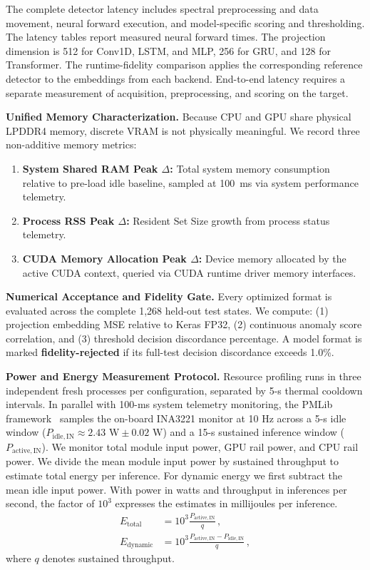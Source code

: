 \documentclass[11pt,a4paper]{article}
\begin{document}
The complete detector latency includes spectral preprocessing and data movement, neural forward execution, and model-specific scoring and thresholding. The latency tables report measured neural forward times. The projection dimension is 512 for Conv1D, LSTM, and MLP, 256 for GRU, and 128 for Transformer. The runtime-fidelity comparison applies the corresponding reference detector to the embeddings from each backend. End-to-end latency requires a separate measurement of acquisition, preprocessing, and scoring on the target.

\textbf{Unified Memory Characterization.} Because CPU and GPU share physical LPDDR4 memory, discrete VRAM is not physically meaningful. We record three non-additive memory metrics:
\begin{enumerate}
    \item \textbf{System Shared RAM Peak $\Delta$:} Total system memory consumption relative to pre-load idle baseline, sampled at 100~ms via system performance telemetry.
    \item \textbf{Process RSS Peak $\Delta$:} Resident Set Size growth from process status telemetry.
    \item \textbf{CUDA Memory Allocation Peak $\Delta$:} Device memory allocated by the active CUDA context, queried via CUDA runtime driver memory interfaces.
\end{enumerate}

\textbf{Numerical Acceptance and Fidelity Gate.} Every optimized format is evaluated across the complete 1,268 held-out test states. We compute: (1) projection embedding MSE relative to Keras FP32, (2) continuous anomaly score correlation, and (3) threshold decision discordance percentage. A model format is marked \textbf{fidelity-rejected} if its full-test decision discordance exceeds 1.0\%.

\textbf{Power and Energy Measurement Protocol.} Resource profiling runs in three independent fresh processes per configuration, separated by 5-s thermal cooldown intervals. In parallel with 100-ms system telemetry monitoring, the PMLib framework~\cite{barrachina2013integrated} samples the on-board INA3221 monitor at 10 Hz across a 5-s idle window ($P_{\mathrm{idle,IN}} \approx 2.43\text{ W} \pm 0.02\text{ W}$) and a 15-s sustained inference window ($P_{\mathrm{active,IN}}$). We monitor total module input power, GPU rail power, and CPU rail power. We divide the mean module input power by sustained throughput to estimate total energy per inference. For dynamic energy we first subtract the mean idle input power. With power in watts and throughput in inferences per second, the factor of $10^3$ expresses the estimates in millijoules per inference.
\begin{align}
E_{\mathrm{total}} &= 10^3\frac{P_{\mathrm{active,IN}}}{q}\,, \\
E_{\mathrm{dynamic}} &= 10^3\frac{P_{\mathrm{active,IN}}-P_{\mathrm{idle,IN}}}{q}\,,
\label{eq:energy-def}
\end{align}
where $q$ denotes sustained throughput.
\end{document}
